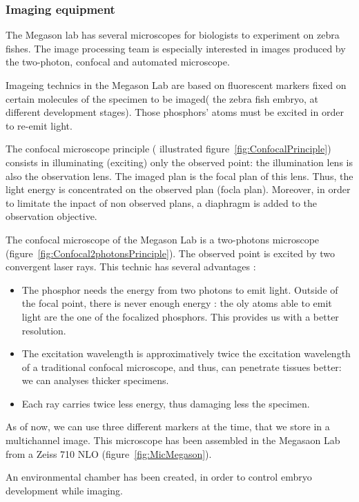 \subsubsection{Imaging equipment}


The Megason lab has several microscopes for biologists to experiment on zebra fishes. The image processing team is especially interested in images produced by the two-photon, confocal and automated microscope.

Imageing technics in the Megason Lab are based on fluorescent markers fixed on certain molecules of the specimen to be imaged( the zebra fish embryo, at different development stages). Those phosphors' atoms must be excited in order to re-emit light.

The confocal microscope principle ( illustrated figure~\ref{fig:ConfocalPrinciple}) consists in illuminating (exciting) only the observed point: the illumination lens is also the observation lens. The imaged plan is the focal plan of this lens. Thus, the light energy is concentrated on the observed plan (focla plan). Moreover, in order to limitate the inpact of non observed plans, a diaphragm is added to the observation objective.

The confocal microscope of the Megason Lab is a two-photons microscope (figure~\ref{fig:Confocal2photonsPrinciple}).
The observed point is excited by two convergent laser rays.
This technic has several advantages :
\begin{itemize}
  \item The phosphor needs the energy from two photons to emit light. Outside of the focal point, there is never enough energy : the oly atoms able to emit light are the one of the focalized phosphors. This provides us with a better resolution.
  \item The excitation wavelength is approximatively twice the excitation wavelength of a traditional confocal microscope, and thus, can penetrate tissues better: we can analyses thicker specimens. 
  \item Each ray carries twice less energy, thus damaging less the specimen.
\end{itemize}

As of now, we can use three different markers at the time, that we store in a multichannel image.
This microscope has been assembled in the Megasaon Lab from a Zeiss 710 NLO (figure~\ref{fig:MicMegason}).

An environmental chamber has been created, in order to control embryo development while imaging.

